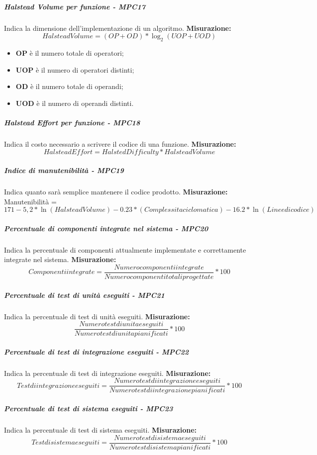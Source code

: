 \subparagraph{Halstead Volume per funzione - MPC17}
Indica la dimensione dell'implementazione di un algoritmo.
\textbf{Misurazione:}\begin{equation}
Halstead Volume = (OP + OD) * \log_2(UOP + UOD)
\end{equation}	
\begin{itemize}
	\item \textbf{OP} è il numero totale di operatori;
	\item \textbf{UOP} è il numero di operatori distinti;
	\item \textbf{OD} è il numero totale di operandi;
	\item \textbf{UOD} è il numero di operandi distinti.
\end{itemize}
\subparagraph{Halstead Effort per funzione - MPC18}
Indica il costo necessario a scrivere il codice di una funzione.
\textbf{Misurazione:}\begin{equation}
Halstead Effort = Halsted Difficulty * Halstead Volume
\end{equation}	
\subparagraph{Indice di manutenibilità - MPC19}
Indica quanto sarà semplice mantenere il codice prodotto.
\textbf{Misurazione:}
Manutenibilità = $171 - 5,2 * \ln(Halstead Volume) - 0.23 * (Complessita ciclomatica) - 16.2 * \ln(Linee di codice)$
\subparagraph{Percentuale di componenti integrate nel sistema - MPC20}
Indica la percentuale di componenti attualmente implementate e correttamente integrate nel sistema.
\textbf{Misurazione:}\begin{equation}
Componenti integrate = \frac{Numero componenti integrate}{Numero componenti totali progettate} * 100
\end{equation}
\subparagraph{Percentuale di test di unità eseguiti - MPC21}
Indica la percentuale di test di unità eseguiti.
\textbf{Misurazione:}\begin{equation}
\frac{Numero test di unita eseguiti}{Numero test di unita pianificati} * 100
\end{equation}
\subparagraph{Percentuale di test di integrazione eseguiti - MPC22}
Indica la percentuale di test di integrazione eseguiti.
\textbf{Misurazione:}\begin{equation}
Test di integrazione eseguiti = \frac{Numero test di integrazione eseguiti}{Numero test di integrazione pianificati} * 100
\end{equation}
\subparagraph{Percentuale di test di sistema eseguiti - MPC23}
Indica la percentuale di test di sistema eseguiti.
\textbf{Misurazione:}\begin{equation}
Test di sistema eseguiti = \frac{Numero test di sistema eseguiti}{Numero test di sistema pianificati} * 100
\end{equation}

